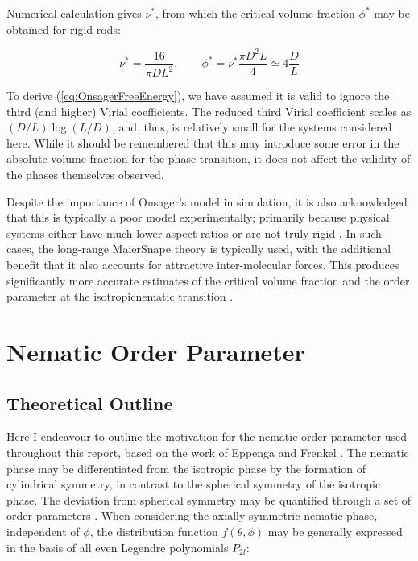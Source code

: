 \documentclass[11pt, a4paper]{article} %
\begin{document}
\begin{appendices}
Numerical calculation gives $\nu^{*}$, from which the critical volume fraction $\phi^{*}$ may be obtained for rigid rods:

\begin{equation}
\nu^{*} = \frac{16}{\pi D L^{2}}, \qquad \phi^{*} = \nu^{*} \frac{\pi D^{2} L}{4} \simeq 4 \frac{D}{L}
\end{equation}


To derive (\ref{eq:OnsagerFreeEnergy}), we have assumed it is valid to ignore the third (and higher) Virial coefficients. The reduced third Virial coefficient scales as $(D/L)\log(L/D)$, and, thus, is relatively small for the systems considered here. While it should be remembered that this may introduce some error in the absolute volume fraction for the phase transition, it does not affect the validity of the phases themselves observed.

Despite the importance of Onsager's model in simulation, it is also acknowledged that this is typically a poor model experimentally; primarily because physical systems either have much lower aspect ratios or are not truly rigid \cite{Odijk1985}. In such cases, the long-range Maier\textendash Snape theory \cite{Maier1959} is typically used, with the additional benefit that it also accounts for attractive inter-molecular forces. This produces significantly more accurate estimates of the critical volume fraction and the order parameter at the isotropic\textendash nematic transition \cite{Zannoni1979b}.

\section{Nematic Order Parameter} \label{sec:NematicOrderAppendix}
\subsection{Theoretical Outline}\label{sec:OrderParamTheory}
Here I endeavour to outline the motivation for the nematic order parameter used throughout this report, based on the work of Eppenga and Frenkel \cite{Eppenga1984, Frenkel1982}. The nematic phase may be differentiated from the isotropic phase by the formation of cylindrical symmetry, in contrast to the spherical symmetry of the isotropic phase. The deviation from spherical symmetry may be quantified through a set of order parameters \cite{Zannoni1979}. When considering the axially symmetric nematic phase, independent of $\phi$, the distribution function $f(\theta, \phi)$ may be generally expressed in the basis of all even Legendre polynomials $P_{2l}$:


\end{appendices}
\end{document}
